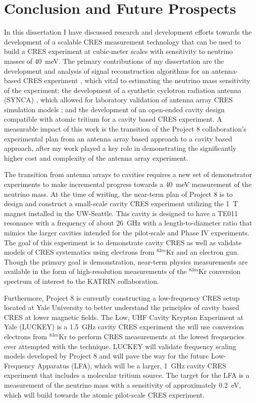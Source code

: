
\chapter{Conclusion and Future Prospects}

In this dissertation I have discussed research and development efforts towards the development of a scalable CRES measurement technology that can be used to build a CRES experiment at cubic-meter scales with sensitivity to neutrino masses of 40~meV. The primary contributions of my dissertation are the development and analysis of signal reconstruction algorithms for an antenna-based CRES experiment \cite{p8phase3trigger}, which vital to estimating the neutrino mass sensitivity of the experiment; the development of a synthetic cyclotron radiation antenna (SYNCA) \cite{p8synca}, which allowed for laboratory validation of antenna array CRES simulation models \cite{p8jugaad}; and the development of an open-ended cavity design compatible with atomic tritium for a cavity based CRES experiment. A measurable impact of this work is the transition of the Project 8 collaboration's experimental plan from an antenna array based approach to a cavity based approach, after my work played a key role in demonstrating the significantly higher cost and complexity of the antenna array experiment.

The transition from antenna arrays to cavities requires a new set of demonstrator experiments to make incremental progress towards a 40~meV measurement of the neutrino mass. At the time of writing, the near-term plan of Project 8 is to design and construct a small-scale cavity CRES experiment utilizing the 1~T magnet installed in the UW-Seattle. This cavity is designed to have a TE011 resonance with a frequency of about 26~GHz with a length-to-diameter ratio that mimics the larger cavities intended for the pilot-scale and Phase IV experiments. The goal of this experiment is to demonstrate cavity CRES as well as validate models of CRES systematics using electrons from $^{83m}$Kr and an electron gun. Though the primary goal is demonstration, near-term physics measurements are available in the form of high-resolution measurements of the $^{83m}$Kr conversion spectrum of interest to the KATRIN collaboration.

Furthermore, Project 8 is currently constructing a low-frequency CRES setup located at Yale University to better understand the principles of cavity based CRES at lower magnetic fields. The Low, UHF Cavity Krypton Experiment at Yale (LUCKEY) is a 1.5~GHz cavity CRES experiment the will use conversion electrons from $^{83m}$Kr to perform CRES measurements at the lowest frequencies ever attempted with the technique. LUCKEY will validate frequency scaling models developed by Project 8 and will pave the way for the future Low-Frequency Apparatus (LFA), which will be a larger, 1~GHz cavity CRES experiment that includes a molecular tritium source. The target for the LFA is a measurement of the neutrino mass with a sensitivity of approximately 0.2~eV, which will build towards the atomic pilot-scale CRES experiment.

